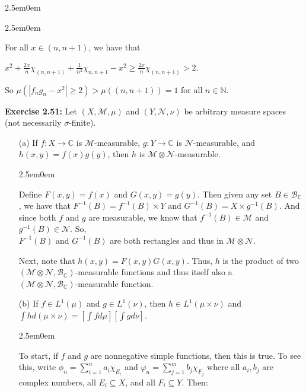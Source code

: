 \documentclass{book}
\newcommand{\exTwoP}{%
   \color{RedViolet}%
   \fontsize{13}{15}\selectfont%
}
\newenvironment{myIndent}{%
   \begin{adjustwidth}{2.5em}{0em}%
}{%
   \end{adjustwidth}%
}
\newcommand{\blab}[1]{\textbf{#1}}
\newcommand{\retTwo}{\hfill\bigbreak}
\begin{document}
\begin{enumerate}
\begin{myIndent}
\begin{myIndent}
			For all $x \in (n, n+1)$, we have that
			
			{\centering $x^2 + \frac{2x}{n}\chi_{(n, n+1)} + \frac{1}{n^2}\chi_{n, n+1} - x^2 \geq \frac{2x}{n}\chi_{(n, n+1)} > 2$.\retTwo\par}

			So $\mu(|f_ng_n - x^2| \geq 2) > \mu((n, n+1)) = 1$ for all $n \in \mathbb{N}$.\retTwo
		\end{myIndent}
	\end{myIndent}
\end{enumerate}

\blab{Exercise 2.51:} Let $(X, \mathcal{M}, \mu)$ and $(Y, \mathcal{N}, \nu)$ be arbitrary measure spaces (not necessarily $\sigma$-finite).

\begin{enumerate}
	\item[(a)] If $f: X \rightarrow \mathbb{C}$ is $\mathcal{M}$-measurable, $g: Y \rightarrow \mathbb{C}$ is $\mathcal{N}$-measurable, and\\ $h(x, y) = f(x)g(y)$, then $h$ is $\mathcal{M} \otimes \mathcal{N}$-measurable.
	
	\begin{myIndent}\exTwoP
		Define $F(x, y) = f(x)$ and $G(x, y) = g(y)$. Then given any set $B \in \mathcal{B}_{\mathbb{C}}$, we have that $F^{-1}(B) = f^{-1}(B) \times Y$ and $G^{-1}(B) = X \times g^{-1}(B)$. And since both $f$ and $g$ are measurable, we know that $f^{-1}(B) \in \mathcal{M}$ and $g^{-1}(B) \in \mathcal{N}$. So,\\ $F^{-1}(B)$ and $G^{-1}(B)$ are both rectangles and thus in $\mathcal{M} \otimes \mathcal{N}$.\retTwo

		Next, note that $h(x, y) = F(x, y)G(x, y)$. Thus, $h$ is the product of two\\ $(\mathcal{M} \otimes \mathcal{N}, \mathcal{B}_{\mathbb{C}})$-measurable functions and thus itself also a\\ $(\mathcal{M} \otimes \mathcal{N}, \mathcal{B}_{\mathbb{C}})$-measurable function.
		\retTwo
	\end{myIndent}

	\item[(b)] If $f \in L^1(\mu)$ and $g \in L^1(\nu)$, then $h \in L^1(\mu \times \nu)$ and $\int h d(\mu \times \nu) = [\int f d\mu][\int g d\nu]$.
	
	\begin{myIndent}\exTwoP
		To start, if $f$ and $g$ are nonnegative simple functions, then this is true. To see this, write $\phi_n = \sum\limits_{i = 1}^n a_i\chi_{E_i}$ and $\varphi_n = \sum\limits_{j = 1}^m b_j \chi_{F_j}$ where all $a_i, b_j$ are complex numbers, all $E_i \subseteq X$, and all $F_i \subseteq Y$. Then:
		

\end{myIndent}
\end{enumerate}
\end{document}
